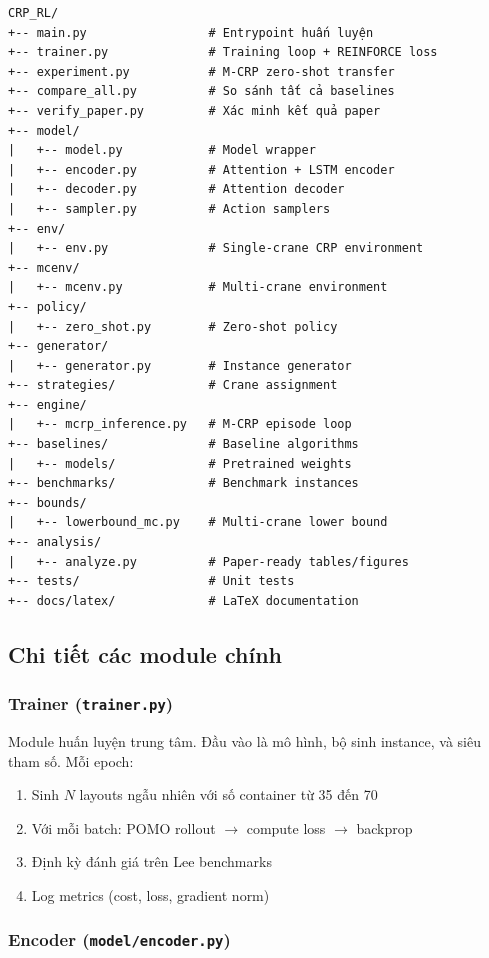 \documentclass[11pt,a4paper]{article}
\theoremstyle{definition}
\begin{document}
\begin{lstlisting}[style=python]
CRP_RL/
+-- main.py                 # Entrypoint huấn luyện
+-- trainer.py              # Training loop + REINFORCE loss
+-- experiment.py           # M-CRP zero-shot transfer
+-- compare_all.py          # So sánh tất cả baselines
+-- verify_paper.py         # Xác minh kết quả paper
+-- model/
|   +-- model.py            # Model wrapper
|   +-- encoder.py          # Attention + LSTM encoder
|   +-- decoder.py          # Attention decoder
|   +-- sampler.py          # Action samplers
+-- env/
|   +-- env.py              # Single-crane CRP environment
+-- mcenv/
|   +-- mcenv.py            # Multi-crane environment
+-- policy/
|   +-- zero_shot.py        # Zero-shot policy
+-- generator/
|   +-- generator.py        # Instance generator
+-- strategies/             # Crane assignment
+-- engine/
|   +-- mcrp_inference.py   # M-CRP episode loop
+-- baselines/              # Baseline algorithms
|   +-- models/             # Pretrained weights
+-- benchmarks/             # Benchmark instances
+-- bounds/
|   +-- lowerbound_mc.py    # Multi-crane lower bound
+-- analysis/
|   +-- analyze.py          # Paper-ready tables/figures
+-- tests/                  # Unit tests
+-- docs/latex/             # LaTeX documentation
\end{lstlisting}

\subsection{Chi tiết các module chính}

\subsubsection{Trainer (\texttt{trainer.py})}

Module huấn luyện trung tâm. Đầu vào là mô hình, bộ sinh instance, và siêu tham số. Mỗi epoch:
\begin{enumerate}
    \item Sinh $N$ layouts ngẫu nhiên với số container từ 35 đến 70
    \item Với mỗi batch: POMO rollout $\to$ compute loss $\to$ backprop
    \item Định kỳ đánh giá trên Lee benchmarks
    \item Log metrics (cost, loss, gradient norm)
\end{enumerate}

\subsubsection{Encoder (\texttt{model/encoder.py})}
\end{document}
